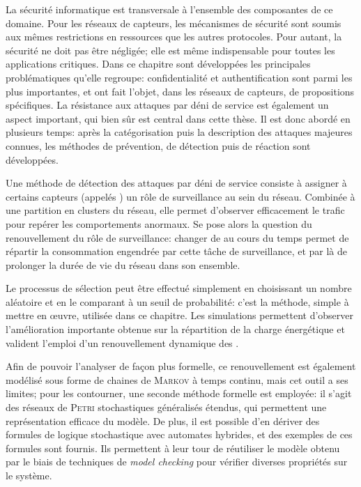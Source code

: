 La sécurité informatique est transversale à l'ensemble des composantes de ce domaine.
Pour les réseaux de capteurs, les mécanismes de sécurité sont soumis aux mêmes restrictions en ressources que les autres protocoles.
Pour autant, la sécurité ne doit pas être négligée; elle est même indispensable pour toutes les applications critiques.
Dans ce chapitre sont développées les principales problématiques qu'elle regroupe: confidentialité et authentification sont parmi les plus importantes, et ont fait l'objet, dans les réseaux de capteurs, de propositions spécifiques.
La résistance aux attaques par déni de service est également un aspect important, qui bien sûr est central dans cette thèse.
Il est donc abordé en plusieurs temps: après la catégorisation puis la description des attaques majeures connues, les méthodes de prévention, de détection puis de réaction sont développées.

Une méthode de détection des attaques par déni de service consiste à assigner à certains capteurs (appelés \cnst) un rôle de surveillance au sein du réseau.
Combinée à une partition en clusters du réseau, elle permet d'observer efficacement le trafic pour repérer les comportements anormaux.
Se pose alors la question du renouvellement du rôle de surveillance: changer de \cnst au cours du temps permet de répartir la consommation engendrée par cette tâche de surveillance, et par là de prolonger la durée de vie du réseau dans son ensemble.

Le processus de sélection peut être effectué simplement en choisissant un nombre aléatoire et en le comparant à un seuil de probabilité: c'est la méthode, simple à mettre en œuvre, utilisée dans ce chapitre.
Les simulations permettent d'observer l'amélioration importante obtenue sur la répartition de la charge énergétique et valident l'emploi d'un renouvellement dynamique des \cnst.

Afin de pouvoir l'analyser de façon plus formelle, ce renouvellement est également modélisé sous forme de chaines de \textsc{Markov} à temps continu, mais cet outil a ses limites; pour les contourner, une seconde méthode formelle est employée: il s'agit des réseaux de \textsc{Petri} stochastiques généralisés étendus, qui permettent une représentation efficace du modèle.
De plus, il est possible d'en dériver des formules de logique stochastique avec automates hybrides, et des exemples de ces formules sont fournis. Ils permettent à leur tour de réutiliser le modèle obtenu par le biais de techniques de \textit{model checking} pour vérifier diverses propriétés sur le système.

